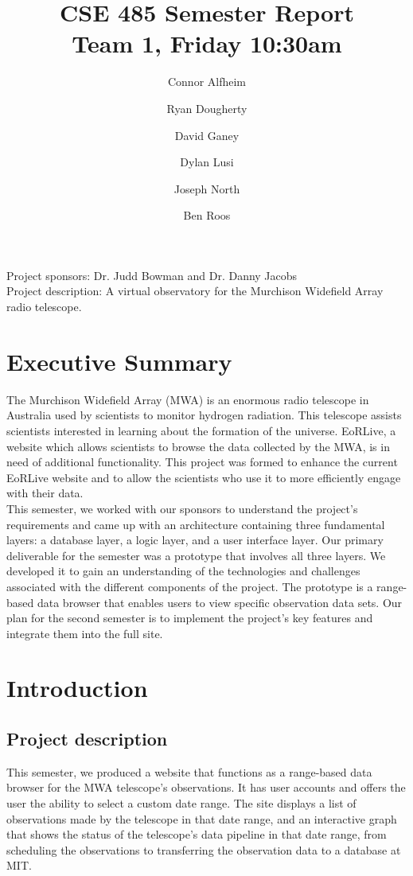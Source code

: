 \documentclass[12pt]{article}
\begin{document}
\begin{spacing}{.4}
\setlength{\droptitle}{-7em}
\title{CSE 485 Semester Report \\  Team 1, Friday 10:30am}
\author{Connor Alfheim \and Ryan Dougherty \and David Ganey \and Dylan Lusi \and Joseph North \and Ben Roos}
\maketitle
\end{spacing}

\begin{spacing}{1.5}
\noindent
Project sponsors: Dr. Judd Bowman and Dr. Danny Jacobs \\
Project description: A virtual observatory for the Murchison Widefield Array radio telescope.
\newpage

\tableofcontents
\newpage

\section{Executive Summary}
The Murchison Widefield Array (MWA) is an enormous radio telescope in Australia used by scientists to monitor hydrogen radiation. This telescope assists scientists interested in learning about the formation of the universe. EoRLive, a website which allows scientists to browse the data collected by the MWA, is in need of additional functionality. This project was formed to enhance the current EoRLive website and to allow the scientists who use it to more efficiently engage with their data.
\\
This semester, we worked with our sponsors to understand the project's requirements and came up with an architecture containing three fundamental layers: a database layer, a logic layer, and a user interface layer. Our primary deliverable for the semester was a prototype that involves all three layers. We developed it to gain an understanding of the technologies and challenges associated with the different components of the project. The prototype is a range-based data browser that enables users to view specific observation data sets. Our plan for the second semester is to implement the project's key features and integrate them into the full site.

\section{Introduction}
\subsection{Project description}
This semester, we produced a website that functions as a range-based data browser for the MWA telescope's observations. It has user accounts and offers the user the ability to select a custom date range. The site displays a list of observations made by the telescope in that date range, and an interactive graph that shows the status of the telescope's data pipeline in that date range, from scheduling the observations to transferring the observation data to a database at MIT.

\end{spacing}
\end{document}
